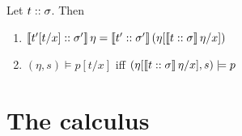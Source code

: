 \documentclass[12pt,a4paper]{report}
\begin{document}
\begin{lemma}[Substitution]
  Let ${t}\mathrel{::}{\sigma}$. Then
  \begin{enumerate}
    \item $\llbracket{t'[t/x]}\mathrel{::}{\sigma'}\rrbracket\,\eta
           = \llbracket{t'}\mathrel{::}{\sigma'}\rrbracket\,(\eta[\llbracket{t}\mathrel{::}{\sigma}\rrbracket\,\eta/x])$
    \item $(\eta,s) \models p[t/x]$ iff $(\eta[\llbracket{t}\mathrel{::}{\sigma}\rrbracket\,\eta/x],s) \models p$
  \end{enumerate}
\end{lemma}



\chapter{The calculus}
\end{document}
